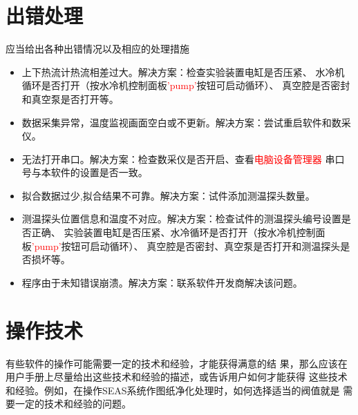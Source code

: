 \section{出错处理}
应当给出各种出错情况以及相应的处理措施
\begin{itemize}
    \item 上下热流计热流相差过大。解决方案：检查实验装置电缸是否压紧、
    水冷机循环是否打开（按水冷机控制面板\textcolor{red}{'pump'}按钮可启动循环）、
    真空腔是否密封和真空泵是否打开等。
    \item 数据采集异常，温度监视画面空白或不更新。解决方案：尝试重启软件和数采仪。
    \item 无法打开串口。解决方案：检查数采仪是否开启、查看\textcolor{red}{电脑设备管理器}
    串口号与本软件的设置是否一致。
    \item 拟合数据过少,拟合结果不可靠。解决方案：试件添加测温探头数量。
    \item 测温探头位置信息和温度不对应。解决方案：检查试件的测温探头编号设置是否正确、
    实验装置电缸是否压紧、水冷循环是否打开（按水冷机控制面板\textcolor{red}{'pump'}按钮可启动循环）、
    真空腔是否密封、真空泵是否打开和测温探头是否损坏等。
    \item 程序由于未知错误崩溃。解决方案：联系软件开发商解决该问题。

\end{itemize}

\section{操作技术}
有些软件的操作可能需要一定的技术和经验，才能获得满意的结
果，那么应该在用户手册上尽量给出这些技术和经验的描述，或告诉用户如何才能获得
这些技术和经验。例如，在操作SEAS系统作图纸净化处理时，如何选择适当的阀值就是
需要一定的技术和经验的问题。